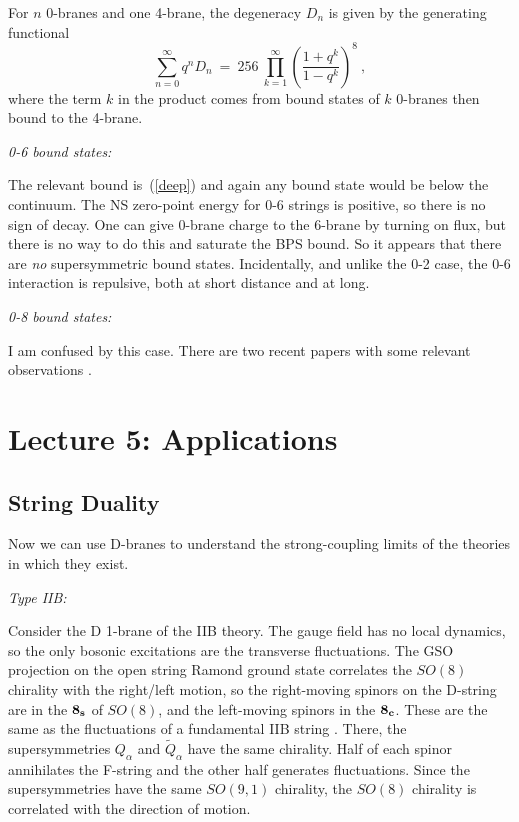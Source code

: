 \documentclass[12pt]{article}
\def\be{\begin{equation}}
\def\ee{\end{equation}}
\begin{document}
For $n$ 0-branes and one 4-brane, the degeneracy $D_n$ is given by the
generating functional \cite{vafa1}
\be
\sum_{n=0}^\infty q^n D_n\ =\ 256\ \prod_{k=1}^\infty \left( \frac{1 + q^k}{1
- q^k}\right)^8\ ,  \label{degen}
\ee
where the term $k$ in the product comes from bound states of $k$ 0-branes
then bound to the 4-brane.

{\it 0-6 bound states:} 

The relevant bound is~(\ref{deep}) and again any
bound state would be below the continuum.  The NS zero-point energy for 0-6
strings is positive, so there is no sign of decay.  One can give 0-brane
charge to the 6-brane
by turning on flux, but there is no way to do this and saturate the
BPS bound.  So it appears that there are {\it no} supersymmetric bound
states.  Incidentally, and unlike the 0-2 case, the 0-6 interaction is
repulsive, both at short distance and \cite{horpriv} at long.

{\it 0-8 bound states:} 

I am confused by this case.  There are two recent
papers with some relevant observations \cite{08}.

\section{Lecture 5: Applications}

\subsection{String Duality}

Now we can use D-branes to understand the strong-coupling limits of the
theories in which they exist.  

{\it Type IIB:}

Consider the D 1-brane of the IIB theory. The gauge field has no local
dynamics, so the only bosonic excitations are the transverse fluctuations.
The GSO projection on the open string Ramond ground state correlates the
$SO(8)$ chirality with the right/left motion, so the right-moving spinors on
the D-string are in the $\bf 8_s$ of $SO(8)$, and the left-moving spinors in
the $\bf 8_c$.
These are the same as the fluctuations of a
fundamental IIB string \cite{witbound}.  There, the supersymmetries
$Q_\alpha$ and $\tilde Q_\alpha$ have the same chirality.  Half of each
spinor annihilates the F-string and the other half generates fluctuations.
Since the supersymmetries have the same $SO(9,1)$ chirality, the $SO(8)$
chirality is correlated with the direction of motion.
\end{document}
